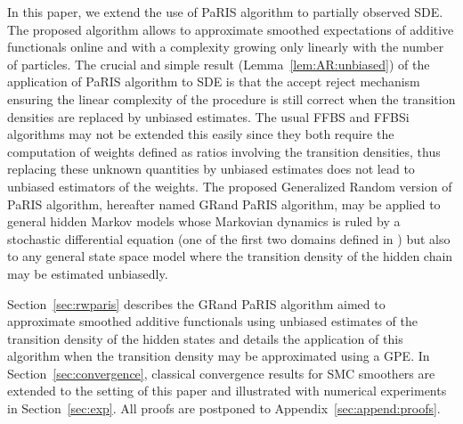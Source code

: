 \documentclass[12pt]{article}
\newcommand{\1}{\mathrm{1}}
\begin{document}
In this paper, we extend the use of  PaRIS algorithm to partially observed SDE. 
The proposed algorithm allows to approximate smoothed expectations of additive functionals online and with a complexity growing only linearly with the number of particles. The crucial and simple result (Lemma~\ref{lem:AR:unbiased}) of the application of PaRIS algorithm to SDE is that the accept reject mechanism ensuring the linear complexity of the procedure is still correct when the transition densities are replaced by unbiased estimates. The usual FFBS and FFBSi algorithms may not be extended this easily since they both require the computation of weights defined as ratios involving the transition densities, thus replacing these unknown quantities by unbiased estimates does not lead to unbiased estimators of the weights. The proposed Generalized Random version of PaRIS algorithm, hereafter named GRand PaRIS algorithm, may be applied to general hidden Markov models whose Markovian dynamics is ruled by a stochastic differential equation (one of the first two domains defined in \cite{beskos:papaspiliopoulos:roberts:fearnhead:2006}) but also to any general state space model where the transition density of the hidden chain may be estimated unbiasedly.



Section~\ref{sec:rwparis} describes the GRand PaRIS algorithm  aimed to approximate smoothed additive functionals using unbiased estimates of the transition density of the hidden states and details the application of this algorithm when the transition density may be approximated using a GPE. 
In Section~\ref{sec:convergence}, classical convergence results for SMC smoothers are extended to the setting of this paper and illustrated with numerical experiments in Section~\ref{sec:exp}. 
All proofs are postponed to Appendix~\ref{sec:append:proofs}.
\end{document}
